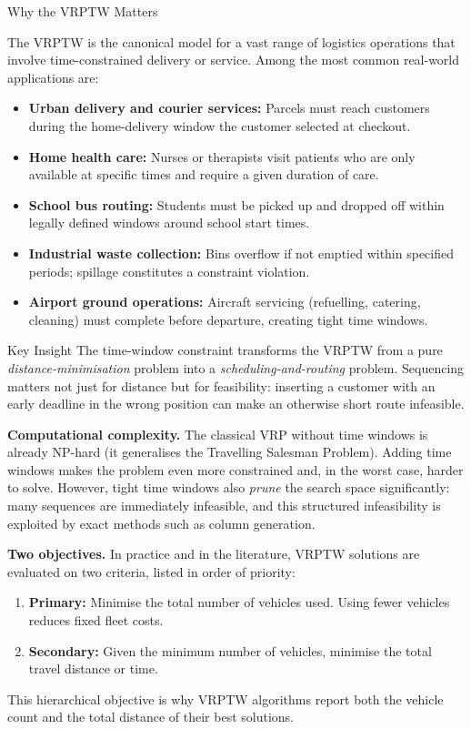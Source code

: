 \documentclass[aspectratio=169,10pt]{beamer}
\begin{document}
\begin{frame}[allowframebreaks]{Why the VRPTW Matters}

The VRPTW is the canonical model for a vast range of logistics operations that
involve time-constrained delivery or service.  Among the most common real-world
applications are:

\begin{itemize}
  \item \textbf{Urban delivery and courier services:} Parcels must reach customers
    during the home-delivery window the customer selected at checkout.
  \item \textbf{Home health care:} Nurses or therapists visit patients who are only
    available at specific times and require a given duration of care.
  \item \textbf{School bus routing:} Students must be picked up and dropped off within
    legally defined windows around school start times.
  \item \textbf{Industrial waste collection:} Bins overflow if not emptied within
    specified periods; spillage constitutes a constraint violation.
  \item \textbf{Airport ground operations:} Aircraft servicing (refuelling, catering,
    cleaning) must complete before departure, creating tight time windows.
\end{itemize}

\begin{alertblock}{Key Insight}
The time-window constraint transforms the VRPTW from a pure
\emph{distance-minimisation} problem into a \emph{scheduling-and-routing}
problem.  Sequencing matters not just for distance but for feasibility:
inserting a customer with an early deadline in the wrong position can make
an otherwise short route infeasible.
\end{alertblock}

\framebreak

\textbf{Computational complexity.}  The classical VRP without time windows is already
NP-hard (it generalises the Travelling Salesman Problem).  Adding time windows
makes the problem even more constrained and, in the worst case, harder to solve.
However, tight time windows also \emph{prune} the search space significantly: many
sequences are immediately infeasible, and this structured infeasibility is exploited
by exact methods such as column generation.

\medskip
\textbf{Two objectives.}  In practice and in the literature, VRPTW solutions are
evaluated on two criteria, listed in order of priority:
\begin{enumerate}
  \item \textbf{Primary:} Minimise the total number of vehicles used.  Using fewer
    vehicles reduces fixed fleet costs.
  \item \textbf{Secondary:} Given the minimum number of vehicles, minimise the total
    travel distance or time.
\end{enumerate}
This hierarchical objective is why VRPTW algorithms report both the vehicle count and
the total distance of their best solutions.


\end{frame}
\end{document}
